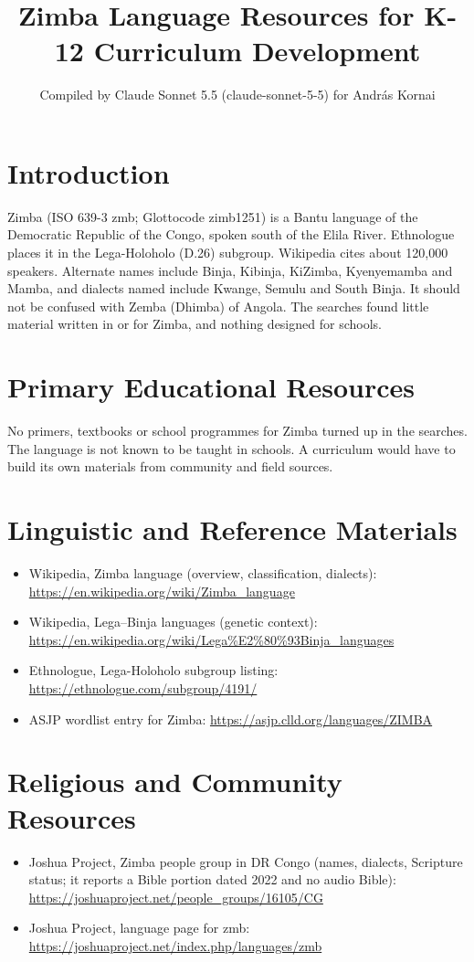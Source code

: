 \documentclass[12pt]{article}
\title{Zimba Language Resources for K-12 Curriculum Development}
\author{Compiled by Claude Sonnet 5.5 (claude-sonnet-5-5) for Andr\'as Kornai}
\date{}
\begin{document}
\maketitle

\section{Introduction}
Zimba (ISO 639-3 zmb; Glottocode zimb1251) is a Bantu language of the Democratic Republic of the Congo, spoken south of the Elila River. Ethnologue places it in the Lega-Holoholo (D.26) subgroup. Wikipedia cites about 120,000 speakers. Alternate names include Binja, Kibinja, KiZimba, Kyenyemamba and Mamba, and dialects named include Kwange, Semulu and South Binja. It should not be confused with Zemba (Dhimba) of Angola. The searches found little material written in or for Zimba, and nothing designed for schools.

\section{Primary Educational Resources}
No primers, textbooks or school programmes for Zimba turned up in the searches. The language is not known to be taught in schools. A curriculum would have to build its own materials from community and field sources.

\section{Linguistic and Reference Materials}
\begin{itemize}
\item Wikipedia, Zimba language (overview, classification, dialects): \url{https://en.wikipedia.org/wiki/Zimba_language}
\item Wikipedia, Lega--Binja languages (genetic context): \url{https://en.wikipedia.org/wiki/Lega%E2%80%93Binja_languages}
\item Ethnologue, Lega-Holoholo subgroup listing: \url{https://ethnologue.com/subgroup/4191/}
\item ASJP wordlist entry for Zimba: \url{https://asjp.clld.org/languages/ZIMBA}
\end{itemize}

\section{Religious and Community Resources}
\begin{itemize}
\item Joshua Project, Zimba people group in DR Congo (names, dialects, Scripture status; it reports a Bible portion dated 2022 and no audio Bible): \url{https://joshuaproject.net/people_groups/16105/CG}
\item Joshua Project, language page for zmb: \url{https://joshuaproject.net/index.php/languages/zmb}
\end{itemize}
\end{document}
